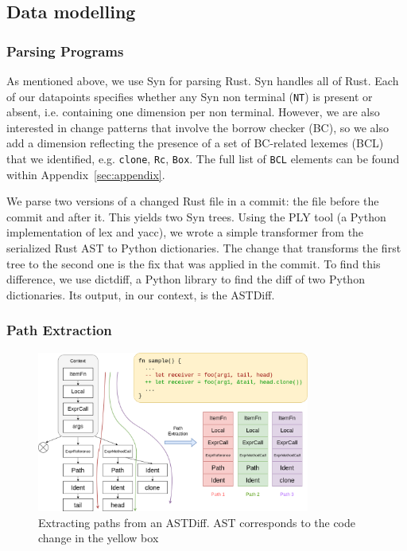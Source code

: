 \subsection{\label{sec:data_modelling}Data modelling}

\subsubsection{\label{sec:parsing_programs}Parsing Programs}

As mentioned above, we use Syn for parsing Rust. Syn handles all of Rust. Each of our datapoints specifies whether any Syn non terminal (\texttt{NT}) is present or absent, i.e. containing one dimension per non terminal. However, we are also interested in change patterns that involve the borrow checker (BC), so we also add a dimension reflecting the presence of a set of BC-related lexemes (BCL) that we identified, e.g. \texttt{clone}, \texttt{Rc}, \texttt{Box}. The full list of \verb+BCL+ elements can be found within Appendix~\ref{sec:appendix}. 

We parse two versions of a changed Rust file in a commit: the file before the commit and after it. This yields two Syn trees. Using the PLY tool (a Python implementation of lex and yacc), we wrote a simple transformer from the serialized Rust AST to Python dictionaries. The change that transforms the first tree to the second one is the fix that was applied in the commit. To find this difference, we use dictdiff, a Python library to find the diff of two Python dictionaries. Its output, in our context, is the ASTDiff.

\subsubsection{\label{sec:path_extraction}Path Extraction}

\begin{figure}[h]
\centering
\includegraphics[width=0.8\textwidth]{figs/extraction.png}
\caption{\label{fig:extraction}Extracting paths from an ASTDiff. AST corresponds to the code change in the yellow box}
\end{figure}


